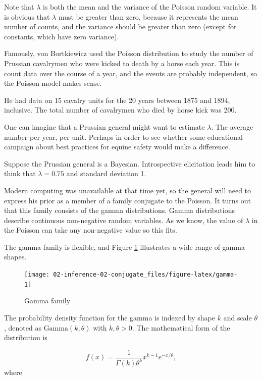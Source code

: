 \documentclass[]{book}
\theoremstyle{definition}
\theoremstyle{definition}
\theoremstyle{definition}
\theoremstyle{remark}
\let\BeginKnitrBlock\begin \let\EndKnitrBlock\end
\begin{document}
Note that \(\lambda\) is both the mean and the variance of the Poisson
random variable. It is obvious that \(\lambda\) must be greater than
zero, because it represents the mean number of counts, and the variance
should be greater than zero (except for constants, which have zero
variance).

\BeginKnitrBlock{example}
\protect\hypertarget{exm:Poisson}{}\label{exm:Poisson} Famously, von
Bortkiewicz used the Poisson distribution to study the number of
Prussian cavalrymen who were kicked to death by a horse each year. This
is count data over the course of a year, and the events are probably
independent, so the Poisson model makes sense.

He had data on 15 cavalry units for the 20 years between 1875 and 1894,
inclusive. The total number of cavalrymen who died by horse kick was
200.

One can imagine that a Prussian general might want to estimate
\(\lambda\). The average number per year, per unit. Perhaps in order to
see whether some educational campaign about best practices for equine
safety would make a difference.
\EndKnitrBlock{example}

Suppose the Prussian general is a Bayesian. Introspective elicitation
leads him to think that \(\lambda=0.75\) and standard deviation 1.

Modern computing was unavailable at that time yet, so the general will
need to express his prior as a member of a family conjugate to the
Poisson. It turns out that this family consists of the gamma
distributions. Gamma distributions describe continuous non-negative
random variables. As we know, the value of \(\lambda\) in the Poisson
can take any non-negative value so this fits.

The gamma family is flexible, and Figure \ref{fig:gamma} illustrates a
wide range of gamma shapes.

\begin{figure}

{\centering \texttt{[image: 02-inference-02-conjugate\_files/figure-latex/gamma-1]} 

}

\caption{Gamma family}\label{fig:gamma}
\end{figure}

The probability density function for the gamma is indexed by shape \(k\)
and scale \(\theta\), denoted as \(\text{Gamma}(k,\theta)\) with
\(k,\theta > 0\). The mathematical form of the distribution is

\[f(x) = \dfrac{1}{\Gamma(k)\theta^k} x^{k-1} e^{-x/\theta},\] where
\end{document}
